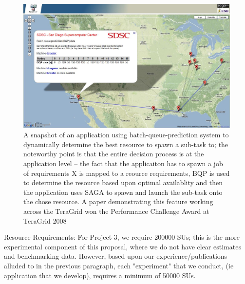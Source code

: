 \documentclass[a4paper,10pt]{article}
\begin{document}
\begin{figure}
\begin{center}
\includegraphics[scale=0.33]{gmaps_bqp.jpg}
\end{center}
\caption{A snapshot of an application using batch-queue-prediction system to dynamically determine the 
best resource to spawn a sub-task to; the noteworthy point is that the entire decision process is at the 
application level -- the fact that the applicaiton has to spawn a job of requirements X is mapped to a
reource requirements, BQP is used to determine the resource based upon optimal availablity and then the 
application uses SAGA to spawn and launch the sub-task onto the chose resource. A paper demonstrating
this feature working across the TeraGrid won the Performance Challenge Award at TeraGrid 2008}
\label{}
\end{figure}

Resource Requirements: For Project 3, we require 200000 SUs; this is the more experimental component
of this proposal, where we do not have clear estimates and benchmarking data. However, based upon our experience/publications alluded to in the previous paragraph, each 
"experiment" that we conduct, (ie application that we develop), requires a minimum of 50000 SUs.






\end{document}
